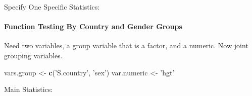 \documentclass[
]{book}
\newenvironment{Shaded}{\begin{snugshade}}{\end{snugshade}}
\newcommand{\DataTypeTok}[1]{\textcolor[rgb]{0.13,0.29,0.53}{#1}}
\newcommand{\KeywordTok}[1]{\textcolor[rgb]{0.13,0.29,0.53}{\textbf{#1}}}
\newcommand{\NormalTok}[1]{#1}
\newcommand{\OperatorTok}[1]{\textcolor[rgb]{0.81,0.36,0.00}{\textbf{#1}}}
\newcommand{\StringTok}[1]{\textcolor[rgb]{0.31,0.60,0.02}{#1}}
\begin{document}
Specify One Specific Statistics:

\begin{Shaded}
\end{Shaded}

\hypertarget{function-testing-by-country-and-gender-groups}{%
\paragraph{Function Testing By Country and Gender Groups}\label{function-testing-by-country-and-gender-groups}}

Need two variables, a group variable that is a factor, and a numeric. Now joint grouping variables.

\begin{Shaded}
\begin{Highlighting}[]
\NormalTok{vars.group <-}\StringTok{ }\KeywordTok{c}\NormalTok{(}\StringTok{'S.country'}\NormalTok{, }\StringTok{'sex'}\NormalTok{)}
\NormalTok{var.numeric <-}\StringTok{ 'hgt'}
\end{Highlighting}
\end{Shaded}

\begin{Shaded}
\end{Shaded}

Main Statistics:

\begin{Shaded}
\end{Shaded}
\end{document}

